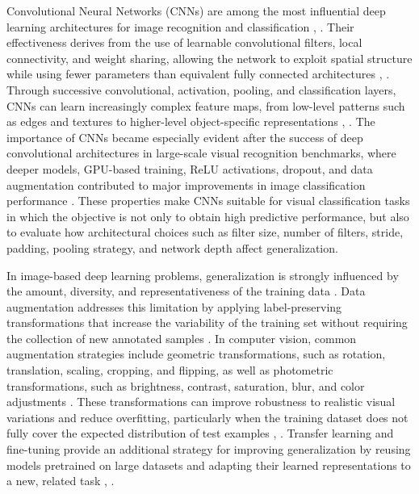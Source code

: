 \documentclass[conference]{IEEEtran}
\begin{document}
Convolutional Neural Networks (CNNs) are among the most influential deep learning architectures for image recognition and classification \cite{b3}, \cite{b4}. Their effectiveness derives from the use of learnable convolutional filters, local connectivity, and weight sharing, allowing the network to exploit spatial structure while using fewer parameters than equivalent fully connected architectures \cite{b1}, \cite{b4}. Through successive convolutional, activation, pooling, and classification layers, CNNs can learn increasingly complex feature maps, from low-level patterns such as edges and textures to higher-level object-specific representations \cite{b4}, \cite{b5}. The importance of CNNs became especially evident after the success of deep convolutional architectures in large-scale visual recognition benchmarks, where deeper models, GPU-based training, ReLU activations, dropout, and data augmentation contributed to major improvements in image classification performance \cite{b3}. These properties make CNNs suitable for visual classification tasks in which the objective is not only to obtain high predictive performance, but also to evaluate how architectural choices such as filter size, number of filters, stride, padding, pooling strategy, and network depth affect generalization.

In image-based deep learning problems, generalization is strongly influenced by the amount, diversity, and representativeness of the training data \cite{b6}. Data augmentation addresses this limitation by applying label-preserving transformations that increase the variability of the training set without requiring the collection of new annotated samples \cite{b6}. In computer vision, common augmentation strategies include geometric transformations, such as rotation, translation, scaling, cropping, and flipping, as well as photometric transformations, such as brightness, contrast, saturation, blur, and color adjustments \cite{b6}. These transformations can improve robustness to realistic visual variations and reduce overfitting, particularly when the training dataset does not fully cover the expected distribution of test examples \cite{b3}, \cite{b6}. Transfer learning and fine-tuning provide an additional strategy for improving generalization by reusing models pretrained on large datasets and adapting their learned representations to a new, related task \cite{b6}, \cite{b7}.
\end{document}
